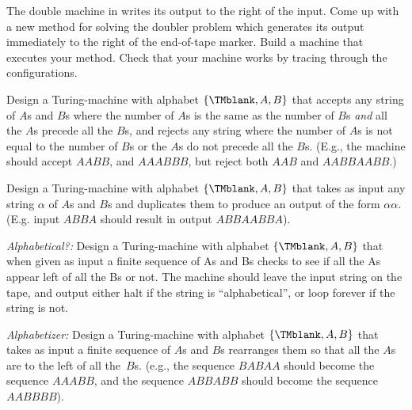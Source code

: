 \documentclass[../../../include/open-logic-section]{subfiles}
\begin{document}
\begin{prob}
The double machine in  writes its
output to the right of the input.  Come up with a new method for
solving the doubler problem which generates its output immediately to
the right of the end-of-tape marker. Build a machine that executes
your method. Check that your machine works by tracing through the
configurations.
\end{prob}

\begin{prob}
Design a Turing-machine with alphabet $\{\TMblank, A, B\}$ that
accepts any string of $A$s and $B$s where the number of $A$s is the
same as the number of $B$s \emph{and} all the $A$s precede all the
$B$s, and rejects any string where the number of $A$s is not equal to
the number of $B$s or the $A$s do not precede all the $B$s. (E.g., the
machine should accept $AABB$, and $AAABBB$, but reject both $AAB$ and
$AABBAABB$.)
\end{prob}

\begin{prob}
Design a Turing-machine with alphabet $\{\TMblank, A, B\}$ that takes
as input any string $\alpha$ of $A$s and $B$s and duplicates them to
produce an output of the form $\alpha\alpha$. (E.g. input $ABBA$
should result in output $ABBAABBA$).
\end{prob}

\begin{prob}
\emph{Alphabetical?:} Design a Turing-machine with alphabet
$\{\TMblank, A, B\}$ that when given as input a finite sequence of As
and Bs checks to see if all the As appear left of all the Bs or
not. The machine should leave the input string on the tape, and output
either halt if the string is ``alphabetical'', or loop forever if the
string is not.
\end{prob}

\begin{prob}
\emph{Alphabetizer:} Design a Turing-machine with alphabet
$\{\TMblank, A, B\}$ that takes as input a finite sequence of $A$s and
$B$s rearranges them so that all the $A$s are to the left of all
the~$B$s. (e.g., the sequence $BABAA$ should become the sequence
$AAABB$, and the sequence $ABBABB$ should become the sequence
$AABBBB$).
\end{prob}
\end{document}
